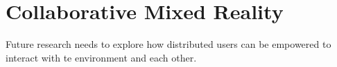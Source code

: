 \chapter{Collaborative Mixed Reality}

Future research needs to explore how distributed users can be empowered to interact with te environment and each other. 